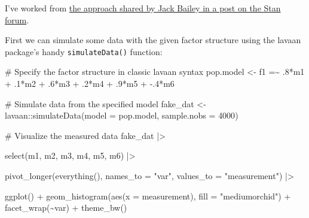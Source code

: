 \documentclass[
  letterpaper,
  DIV=11,
  numbers=noendperiod]{scrreprt}
\newenvironment{Shaded}{\begin{snugshade}}{\end{snugshade}}
\newcommand{\AttributeTok}[1]{\textcolor[rgb]{0.40,0.45,0.13}{#1}}
\newcommand{\CommentTok}[1]{\textcolor[rgb]{0.37,0.37,0.37}{#1}}
\newcommand{\DecValTok}[1]{\textcolor[rgb]{0.68,0.00,0.00}{#1}}
\newcommand{\FunctionTok}[1]{\textcolor[rgb]{0.28,0.35,0.67}{#1}}
\newcommand{\NormalTok}[1]{\textcolor[rgb]{0.00,0.23,0.31}{#1}}
\newcommand{\OtherTok}[1]{\textcolor[rgb]{0.00,0.23,0.31}{#1}}
\newcommand{\SpecialCharTok}[1]{\textcolor[rgb]{0.37,0.37,0.37}{#1}}
\newcommand{\StringTok}[1]{\textcolor[rgb]{0.13,0.47,0.30}{#1}}
\begin{document}
I've worked from
\href{https://discourse.mc-stan.org/t/confirmatory-factor-analysis-using-brms/23139}{the
approach shared by Jack Bailey in a post on the Stan forum}.

First we can simulate some data with the given factor structure using
the lavaan package's handy \texttt{simulateData()} function:

\begin{Shaded}
\begin{Highlighting}[]
\CommentTok{\# Specify the factor structure in classic lavaan syntax}
\NormalTok{pop.model }\OtherTok{\textless{}{-}} \StringTok{\textquotesingle{} }
\StringTok{  f1 =\textasciitilde{} .8*m1 + .1*m2 + .6*m3 + .2*m4 + .9*m5 + {-}.4*m6}
\StringTok{\textquotesingle{}}

\CommentTok{\# Simulate data from the specified model }
\NormalTok{fake\_dat }\OtherTok{\textless{}{-}}\NormalTok{ lavaan}\SpecialCharTok{::}\FunctionTok{simulateData}\NormalTok{(}\AttributeTok{model =}\NormalTok{ pop.model, }\AttributeTok{sample.nobs =} \DecValTok{4000}\NormalTok{)}

\CommentTok{\# Visualize the measured data}
\NormalTok{fake\_dat }\SpecialCharTok{|\textgreater{}}

  \FunctionTok{select}\NormalTok{(m1, m2, m3, m4, m5, m6) }\SpecialCharTok{|\textgreater{}}
  
  \FunctionTok{pivot\_longer}\NormalTok{(}\FunctionTok{everything}\NormalTok{(), }\AttributeTok{names\_to =} \StringTok{"var"}\NormalTok{, }\AttributeTok{values\_to =} \StringTok{"measurement"}\NormalTok{) }\SpecialCharTok{|\textgreater{}}

  \FunctionTok{ggplot}\NormalTok{() }\SpecialCharTok{+}
  \FunctionTok{geom\_histogram}\NormalTok{(}\FunctionTok{aes}\NormalTok{(}\AttributeTok{x =}\NormalTok{ measurement), }\AttributeTok{fill =} \StringTok{"mediumorchid"}\NormalTok{) }\SpecialCharTok{+}
  \FunctionTok{facet\_wrap}\NormalTok{(}\SpecialCharTok{\textasciitilde{}}\NormalTok{var) }\SpecialCharTok{+}
  \FunctionTok{theme\_bw}\NormalTok{()}
\end{Highlighting}
\end{Shaded}
\end{document}
